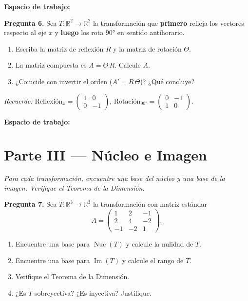 \documentclass[12pt, letterpaper]{article}
\newcommand{\R}{\mathbb{R}}
\newcommand{\Ker}{\operatorname{Nuc}}   %
\newcommand{\Img}{\operatorname{Im}}    %
\newcommand{\mat}[1]{\begin{pmatrix}#1\end{pmatrix}}
\begin{document}
\vspace{4pt}

\noindent\textbf{Espacio de trabajo:}
\vspace{6cm}

\begin{cajapregunta}
\textbf{Pregunta 6.}
Sea $T:\R^2\to\R^2$ la transformación que \textbf{primero} refleja los vectores respecto al eje $x$ y \textbf{luego} los rota $90°$ en sentido antihorario.

\begin{enumerate}[label=\alph*)]
  \item Escriba la matriz de reflexión $R$ y la matriz de rotación $\Theta$.
  \item La matriz compuesta es $A = \Theta\, R$. Calcule $A$.
  \item ¿Coincide con invertir el orden ($A' = R\,\Theta$)? ¿Qué concluye?
\end{enumerate}

\textit{Recuerde:}
$\text{Reflexión}_x = \mat{1&0\\0&-1}$,\quad
$\text{Rotación}_{90°} = \mat{0&-1\\1&0}$.
\end{cajapregunta}

\vspace{4pt}

\noindent\textbf{Espacio de trabajo:}
\vspace{6cm}

\newpage

\section*{\color{azuloscuro} Parte III — Núcleo e Imagen}
\textit{Para cada transformación, encuentre una base del núcleo y una base de la imagen.
Verifique el Teorema de la Dimensión.}

\vspace{6pt}

\begin{cajapregunta}
\textbf{Pregunta 7.}
Sea $T:\R^3\to\R^3$ la transformación con matriz estándar
\[
  A = \mat{1 & 2 & -1 \\ 2 & 4 & -2 \\ -1 & -2 & 1}.
\]
\begin{enumerate}[label=\alph*)]
  \item Encuentre una base para $\Ker(T)$ y calcule la nulidad de $T$.
  \item Encuentre una base para $\Img(T)$ y calcule el rango de $T$.
  \item Verifique el Teorema de la Dimensión.
  \item ¿Es $T$ sobreyectiva? ¿Es inyectiva? Justifique.
\end{enumerate}
\end{cajapregunta}
\end{document}
